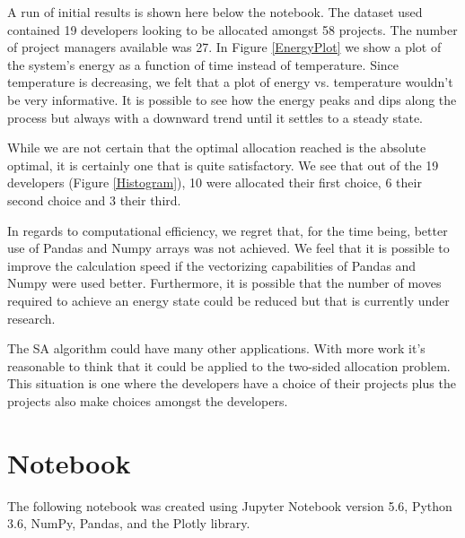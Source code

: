 \documentclass[11pt]{article}
\begin{document}
A run of initial results is shown here below the notebook. The dataset
used contained 19 developers looking to be allocated amongst 58
projects. The number of project managers available was 27. In Figure \ref{EnergyPlot}
we show a plot of the system's energy as a function of time instead of
temperature. Since temperature is decreasing, we felt that a plot of
energy vs. temperature wouldn't be very informative. It is possible to
see how the energy peaks and dips along the process but always with a
downward trend until it settles to a steady state.

While we are not certain that the optimal allocation reached is the
absolute optimal, it is certainly one that is quite satisfactory. We see
that out of the 19 developers (Figure \ref{Histogram}), 10 were allocated their first
choice, 6 their second choice and 3 their third.

In regards to computational efficiency, we regret that, for the time
being, better use of Pandas and Numpy arrays was not achieved. We feel
that it is possible to improve the calculation speed if the vectorizing
capabilities of Pandas and Numpy were used better. Furthermore, it is
possible that the number of moves required to achieve an energy state
could be reduced but that is currently under research.

The SA algorithm could have many other applications. With more work it's
reasonable to think that it could be applied to the two-sided allocation
problem. This situation is one where the developers have a choice of
their projects plus the projects also make choices amongst the
developers.

    \section{Notebook}\label{notebook}

The following notebook was created using Jupyter Notebook version 5.6,
Python 3.6, NumPy, Pandas, and the Plotly library.
\end{document}
